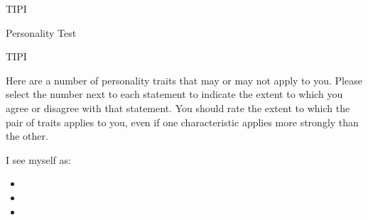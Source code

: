 
\begin{edXchapter}{TIPI}


\begin{edXsection}{Personality Test}

\begin{edXproblem}{TIPI}

Here are a number of personality traits that may or may not apply to you.  Please select the number next to each statement to indicate the extent to which you agree or disagree with that statement. You should rate the extent to which the pair of traits applies to you, even if one characteristic applies more strongly than the other.           
 
I see myself as:

\begin{itemize}
\item {} 
\item {} 
\item {} 
\end{itemize}
%

\end{edXproblem}

\end{edXsection}
\end{edXchapter}
